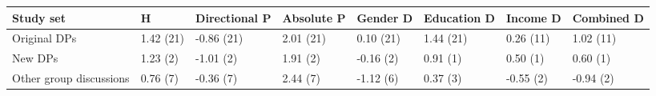 
\begin{tabular}{llllllll}
\toprule
Study set & H & Directional P & Absolute P & Gender D & Education D & Income D & Combined D\\
\midrule
Original DPs & 1.42 (21) & -0.86 (21) & 2.01 (21) & 0.10 (21) & 1.44 (21) & 0.26 (11) & 1.02 (11)\\
New DPs & 1.23 (2) & -1.01 (2) & 1.91 (2) & -0.16 (2) & 0.91 (1) & 0.50 (1) & 0.60 (1)\\
Other group discussions & 0.76 (7) & -0.36 (7) & 2.44 (7) & -1.12 (6) & 0.37 (3) & -0.55 (2) & -0.94 (2)\\
\bottomrule
\end{tabular}
